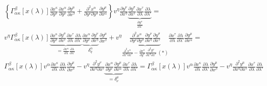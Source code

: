 \begin{multline}
    \left\{\Gamma_{\alpha\kappa}^\beta\left[x(\lambda)\right]
    \frac{\partial x^\kappa}{\partial y^\sigma}
    \frac{\partial x^\alpha}{\partial y^\nu}
    \frac{\partial y^\mu}{\partial x^\beta}
    +
    \frac{\partial^2 x^\alpha}{\partial y^\nu \partial y^\sigma}
    \frac{\partial y^\mu}{\partial x^\alpha}\right\}
    v^\eta \frac{\partial y^\nu}{\partial x^\eta}
    \underbrace{\frac{\partial y^\sigma}{\partial x^\tau}
    \frac{\partial x^\tau}{\partial \lambda}
    \frac{\partial \lambda}{\partial \lambda'}}_{\frac{\partial y^\sigma}{\partial \lambda'}}= \\
    v^\eta\Gamma_{\alpha\kappa}^\beta\left[x(\lambda)\right]
    \underbrace{\frac{\partial x^\kappa}{\partial y^\sigma}
        \frac{\partial y^\sigma}{\partial x^\tau}
        \frac{\partial x^\tau}{\partial \lambda}
        \frac{\partial \lambda}{\partial \lambda'}}_{
        =\frac{\partial x^\kappa}{\partial \lambda}\frac{\partial \lambda}{\partial \lambda'}}
    \underbrace{\frac{\partial x^\alpha}{\partial y^\nu}
        \frac{\partial y^\nu}{\partial x^\eta}}_{\delta_\eta^\alpha}
    \frac{\partial y^\mu}{\partial x^\beta}
    +
    v^\eta\underbrace{\frac{\partial^2 x^\alpha}{\partial y^\nu \partial y^\sigma}
        \frac{\partial y^\nu}{\partial x^\eta}
        \frac{\partial y^\sigma}{\partial x^\tau}}_{
        \frac{\partial^2 x^\alpha}{\partial x^\eta \partial x^\tau} -
        \frac{\partial x^\alpha}{\partial y^\nu}
        \frac{\partial^2 y^\nu}{\partial x^\eta \partial x^\tau}~(*)}
    \frac{\partial x^\tau}{\partial \lambda}
    \frac{\partial \lambda}{\partial \lambda'}
    \frac{\partial y^\mu}{\partial x^\alpha}= \\
    \Gamma_{\alpha\kappa}^\beta\left[x(\lambda)\right]v^\alpha
    \frac{\partial x^\kappa}{\partial \lambda}\frac{\partial \lambda}{\partial \lambda'}
    \frac{\partial y^\mu}{\partial x^\beta} -
    v^\eta\frac{\partial^2 y^\nu}{\partial x^\eta \partial x^\tau}
    \underbrace{\frac{\partial x^\alpha}{\partial y^\nu}
        \frac{\partial y^\mu}{\partial x^\alpha}}_{=\delta^\mu_\nu}
    \frac{\partial x^\tau}{\partial \lambda}
    \frac{\partial \lambda}{\partial \lambda'}=
    \Gamma_{\alpha\kappa}^\beta\left[x(\lambda)\right]v^\alpha
    \frac{\partial x^\kappa}{\partial \lambda}\frac{\partial \lambda}{\partial \lambda'}
    \frac{\partial y^\mu}{\partial x^\beta} -
    v^\eta\frac{\partial^2 y^\mu}{\partial x^\eta \partial x^\tau}
    \frac{\partial x^\tau}{\partial \lambda}
    \frac{\partial \lambda}{\partial \lambda'}
\end{multline}

